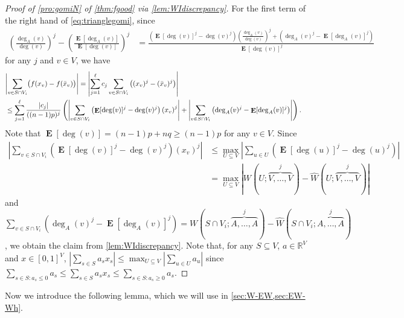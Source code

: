 \documentclass[letterpaper,11pt]{article}
\newcommand{\Wh}{\hat{W}}
\DeclareMathOperator{\E}{\mathbf{E}}
\begin{document}
\begin{proof}[Proof of \ref{pro:gomiN} of \cref{thm:fgood} via \cref{lem:WIdiscrepancy}]
For the first term of the right hand of \cref{eq:trianglegomi}, since
\begin{align*}
\left(\frac{\deg_A(v)}{\deg(v)}\right)^j-\left(\frac{\E[\deg_A(v)]}{\E[\deg(v)]}\right)^j
&=\frac{\left(\E[\deg(v)]^j-\deg(v)^j\right)\left(\frac{\deg_A(v)}{\deg(v)}\right)^j+\left(\deg_A(v)^j-\E[\deg_A(v)]^j\right)}{\E[\deg(v)]^j}
\end{align*}
for any $j$ and $v\in V$, we have
\begin{align*}
\lefteqn{\left|\sum_{v\in S\cap V_i}\bigl(f(x_v)-f(\bar{x}_v)\bigr)\right|
=\left|\sum_{j=1}^{\ell}c_j \sum_{v\in S\cap V_i}\left((x_v)^j-(\bar{x}_v)^j\right)\right|}\\
&\leq \sum_{j=1}^\ell \frac{|c_j|}{((n-1)p)^j} \left(\left|\sum_{v\in S\cap V_i}\left(\E[\deg(v)]^{j}-\deg(v)^j\right)\left(x_v\right)^j \right|+\left| \sum_{v\in S\cap V_i}\left(\deg_A(v)^j-\E[\deg_A(v)]^j\right)\right|\right).
\end{align*}
Note that $\E[\deg(v)]=(n-1)p+nq\geq (n-1)p$ for any $v\in V$.
Since
\begin{align*}
\left|\sum_{v\in S\cap V_i}\left(\E[\deg(v)]^{j}-\deg(v)^j\right)\left(x_v\right)^j \right|
&\leq \max_{U\subseteq V}\left|\sum_{u\in U}\left(\E[\deg(u)]^{j}-\deg(u)^j\right)\right|\\
&=\max_{U\subseteq V}\left|W(U;\overbrace{V,\ldots,V}^{j})-\Wh(U;\overbrace{V,\ldots,V}^{j})\right|
\end{align*}
and $\sum_{v\in S\cap V_i}\left(\deg_A(v)^j-\E[\deg_A(v)]^j\right)=W(S\cap V_i;\overbrace{A,\ldots,A}^{j})-\Wh(S\cap V_i;\overbrace{A,\ldots,A}^{j})$, 
we obtain the claim from \cref{lem:WIdiscrepancy}.
Note that, for any $S\subseteq V$, $a\in \mathbb{R}^V$ and $x\in [0,1]^V$, $|\sum_{s\in S}a_sx_s|\leq \max_{U\subseteq V}|\sum_{u\in U}a_u|$ since 
$\sum_{s\in S:a_s\leq 0}a_s \leq \sum_{s\in S}a_sx_s\leq \sum_{s\in S:a_s\geq 0}a_s$.
%
\end{proof}
Now we introduce the following lemma, which we will use in \cref{sec:W-EW,sec:EW-Wh}.
%
\end{document}
